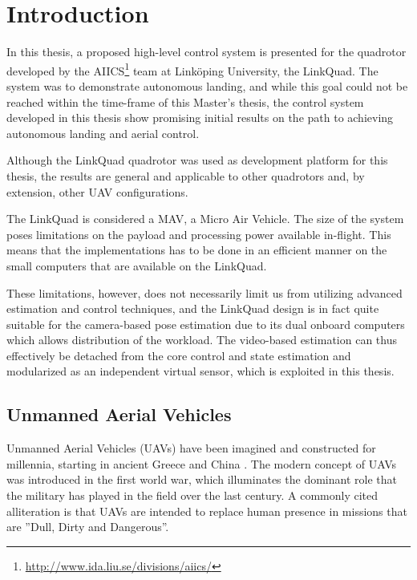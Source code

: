 \chapter{Introduction}
\label{cha:introduction}
    In this thesis, a proposed high-level control system is presented
    for the quadrotor developed by the AIICS\footnote{\url{http://www.ida.liu.se/divisions/aiics/}}
    team at Linköping University, the LinkQuad.
    The system was to demonstrate autonomous landing, and while this goal
    could not be reached within the time-frame of this Master's thesis, the control
    system developed in this thesis show promising initial results on
    the path to achieving autonomous landing and aerial control.

    Although the LinkQuad quadrotor was used as development platform for this thesis,
    the results are general and applicable to other quadrotors and, by extension, other UAV configurations.

    The LinkQuad is considered a MAV, a Micro Air Vehicle. %
    The size of the system poses limitations on the payload and processing power
    available in-flight. This means that the implementations has to be done
    in an efficient manner on the small computers that are available on the LinkQuad.

    These limitations, however, does not necessarily limit us from utilizing advanced estimation
    and control techniques, and the LinkQuad design is in fact
    quite suitable for the camera-based pose estimation due to its dual
    onboard computers which allows distribution of the workload.
    The video-based estimation can thus effectively be detached from the
    core control and state estimation and modularized as an independent
    virtual sensor, which is exploited in this thesis.

\section{Unmanned Aerial Vehicles}
    Unmanned Aerial Vehicles (UAVs) have been imagined and constructed for millennia, starting in ancient Greece and China \citep{valavanis2007advances}.
    The modern concept of UAVs was introduced in the first world war, which
    illuminates the dominant role that the military has played in the field over the
    last century. A commonly cited alliteration is that UAVs are intended to replace
    human presence in missions that are ''Dull, Dirty and Dangerous''.

